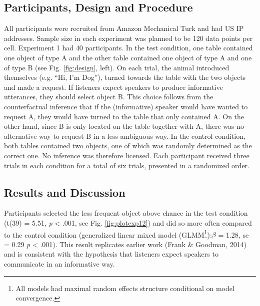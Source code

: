 \documentclass[10pt, letterpaper]{article}
\begin{document}
\subsection{Participants, Design and
Procedure}\label{participants-design-and-procedure}

All participants were recruited from Amazon Mechanical Turk and had US
IP addresses. Sample size in each experiment was planned to be 120 data
points per cell. Experiment 1 had 40 participants. In the test
condition, one table contained one object of type A and the other table
contained one object of type A and one of type B (see Fig.
\ref{fig:design}, left). On each trial, the animal introduced themselves
(e.g. ``Hi, I'm Dog''), turned towards the table with the two objects
and made a request. If listeners expect speakers to produce informative
utterances, they should select object B. This choice follows from the
counterfactual inference that if the (informative) speaker would have
wanted to request A, they would have turned to the table that only
contained A. On the other hand, since B is only located on the table
together with A, there was no alternative way to request B in a less
ambiguous way. In the control condition, both tables contained two
objects, one of which was randomly determined as the correct one. No
inference was therefore licensed. Each participant received three trials
in each condition for a total of six trials, presented in a randomized
order.

\subsection{Results and Discussion}\label{results-and-discussion}

Participants selected the less frequent object above chance in the test
condition (t(39) = 5.51, \emph{p} \textless{} .001, see Fig.
\ref{fig:plotexp12}) and did so more often compared to the control
condition (generalized linear mixed model
(GLMM\footnote{All models had maximal random effects structure conditional on model convergence.}):\emph{\(\beta\)}
= 1.28, se = 0.29 \emph{p} \textless{} .001). This result replicates
earlier work (Frank \& Goodman, 2014) and is consistent with the
hypothesis that listeners expect speakers to communicate in an
informative way.
\end{document}
